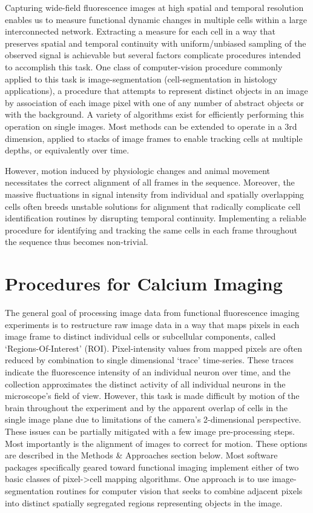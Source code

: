 \documentclass[
  12pt,
]{report}
\numberwithin{figure}{section}
\numberwithin{table}{section}
\numberwithin{equations}{section}
\begin{document}
Capturing wide-field fluorescence images at high spatial and temporal
resolution enables us to measure functional dynamic changes in multiple
cells within a large interconnected network. Extracting a measure for
each cell in a way that preserves spatial and temporal continuity with
uniform/unbiased sampling of the observed signal is achievable but
several factors complicate procedures intended to accomplish this task.
One class of computer-vision procedure commonly applied to this task is
image-segmentation (cell-segmentation in histology applications), a
procedure that attempts to represent distinct objects in an image by
association of each image pixel with one of any number of abstract
objects or with the background. A variety of algorithms exist for
efficiently performing this operation on single images. Most methods can
be extended to operate in a 3rd dimension, applied to stacks of image
frames to enable tracking cells at multiple depths, or equivalently over
time.

However, motion induced by physiologic changes and animal movement
necessitates the correct alignment of all frames in the sequence.
Moreover, the massive fluctuations in signal intensity from individual
and spatially overlapping cells often breeds unstable solutions for
alignment that radically complicate cell identification routines by
disrupting temporal continuity. Implementing a reliable procedure for
identifying and tracking the same cells in each frame throughout the
sequence thus becomes non-trivial.

\hypertarget{procedures-for-calcium-imaging}{%
\section{Procedures for Calcium
Imaging}\label{procedures-for-calcium-imaging}}

The general goal of processing image data from functional fluorescence
imaging experiments is to restructure raw image data in a way that maps
pixels in each image frame to distinct individual cells or subcellular
components, called `Regions-Of-Interest' (ROI). Pixel-intensity values
from mapped pixels are often reduced by combination to single
dimensional `trace' time-series. These traces indicate the fluorescence
intensity of an individual neuron over time, and the collection
approximates the distinct activity of all individual neurons in the
microscope's field of view. However, this task is made difficult by
motion of the brain throughout the experiment and by the apparent
overlap of cells in the single image plane due to limitations of the
camera's 2-dimensional perspective. These issues can be partially
mitigated with a few image pre-processing steps. Most importantly is the
alignment of images to correct for motion. These options are described
in the Methods \& Approaches section below. Most software packages
specifically geared toward functional imaging implement either of two
basic classes of pixel-\textgreater{}cell mapping algorithms. One
approach is to use image-segmentation routines for computer vision that
seeks to combine adjacent pixels into distinct spatially segregated
regions representing objects in the image.
\end{document}
